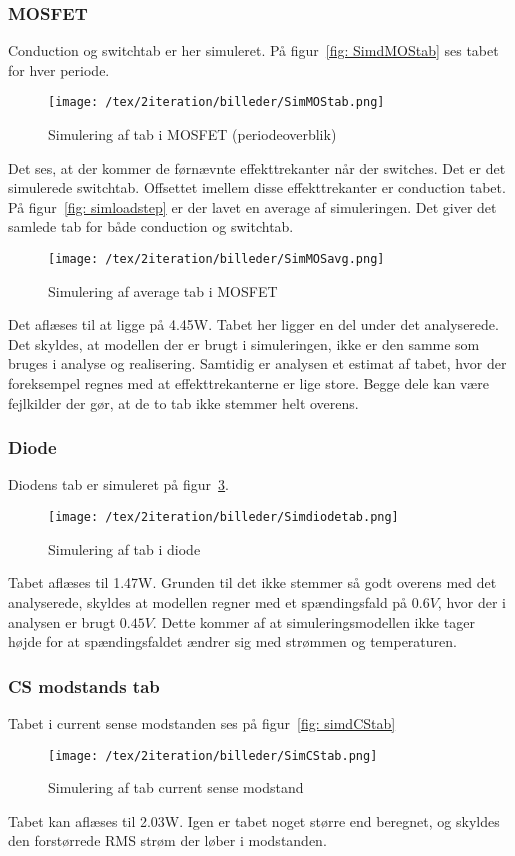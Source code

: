 \subsubsection{MOSFET}
Conduction og switchtab er her simuleret. På figur~\ref{fig: SimdMOStab} ses tabet for hver periode.
\begin{figure}[H]
	\center
	\texttt{[image: /tex/2iteration/billeder/SimMOStab.png]}
	\caption{Simulering af tab i MOSFET (periodeoverblik)}
	\label{fig: SimMOStab}
\end{figure} 
Det ses, at der kommer de førnævnte effekttrekanter når der switches. Det er det simulerede switchtab. Offsettet imellem disse effekttrekanter er conduction tabet.
På figur~\ref{fig: simloadstep} er der lavet en average af simuleringen. Det giver det samlede tab for både conduction og switchtab. 
\begin{figure}[H]
	\center
	\texttt{[image: /tex/2iteration/billeder/SimMOSavg.png]}
	\caption{Simulering af average tab i MOSFET}
	\label{fig: SimMOSavg}
\end{figure} 
Det aflæses til at ligge på 4.45W. Tabet her ligger en del  under det analyserede. Det skyldes, at modellen der er brugt i simuleringen, ikke er den samme som bruges i analyse og realisering. Samtidig er analysen et estimat af tabet, hvor der foreksempel regnes med at effekttrekanterne er lige store. Begge dele kan være fejlkilder der gør, at de to tab ikke stemmer helt overens.  

\subsubsection{Diode}
Diodens tab er simuleret på figur~\ref{fig: simdiodetab}. 
\begin{figure}[H]
	\center
	\texttt{[image: /tex/2iteration/billeder/Simdiodetab.png]}
	\caption{Simulering af tab i diode}
	\label{fig: simdiodetab}
\end{figure}
Tabet aflæses til 1.47W. Grunden til det ikke stemmer så godt overens med det analyserede, skyldes at modellen regner med et spændingsfald på $0.6V$, hvor der i analysen er brugt $0.45V$. Dette kommer af at simuleringsmodellen ikke tager højde for at spændingsfaldet ændrer sig med strømmen og temperaturen. 

\subsubsection{CS modstands tab}
Tabet i current sense modstanden ses på figur~\ref{fig: simdCStab}
\begin{figure}[H]
	\center
	\texttt{[image: /tex/2iteration/billeder/SimCStab.png]}
	\caption{Simulering af tab current sense modstand}
	\label{fig: simCStab}
\end{figure}
Tabet kan aflæses til 2.03W. Igen er tabet noget større end beregnet, og skyldes den forstørrede RMS strøm der løber i modstanden.


